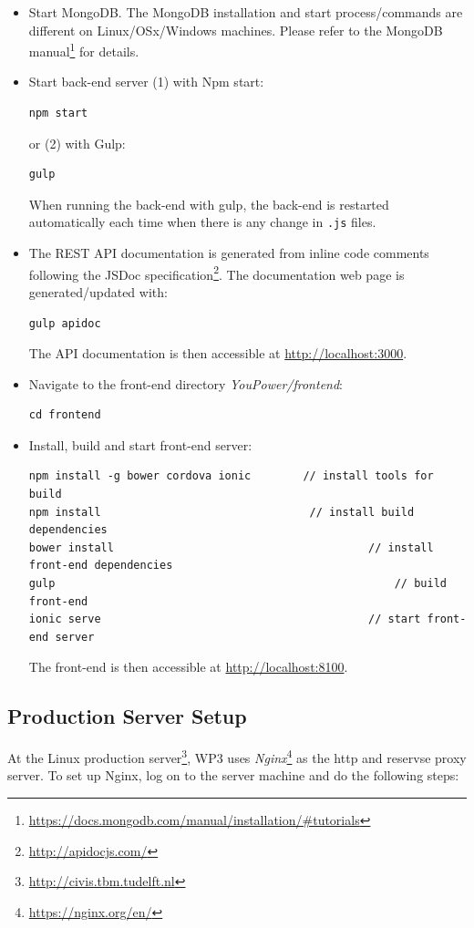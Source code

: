 \begin{itemize}
\item Start MongoDB. The MongoDB installation and start process/commands are different on Linux/OSx/Windows machines. Please refer to the MongoDB manual\footnote{\url{https://docs.mongodb.com/manual/installation/\#tutorials}} for details.  

\item Start back-end server (1) with Npm start: 
\begin{lstlisting}
npm start
\end{lstlisting}
or (2) with Gulp: 
\begin{lstlisting}
gulp
\end{lstlisting}
When running the back-end with gulp, the back-end is restarted automatically each time when there is any change in \texttt{\small *.js} files. 

\item The REST API documentation is generated from inline code comments following the JSDoc specification\footnote{\url{http://apidocjs.com/}}. The documentation web page is generated/updated with:  
\begin{lstlisting}
gulp apidoc
\end{lstlisting}
The API documentation is then accessible at {\small\url{http://localhost:3000}}.

\item Navigate to the front-end directory \textit{YouPower/frontend}: 
\begin{lstlisting}
cd frontend                      
\end{lstlisting}

\item Install, build and start front-end server: 
\begin{lstlisting}
npm install -g bower cordova ionic        // install tools for build
npm install                          	   // install build dependencies
bower install										// install front-end dependencies
gulp													// build front-end
ionic serve											// start front-end server
\end{lstlisting}
The front-end is then accessible at {\small\url{http://localhost:8100}}.

\end{itemize} 

\subsection{Production Server Setup}

At the Linux production server\footnote{\url{http://civis.tbm.tudelft.nl}}, WP3 uses \textit{Nginx}\footnote{\url{https://nginx.org/en/}} as the http and reservse proxy server. 
To set up Nginx, log on to the server machine and do the following steps: 

